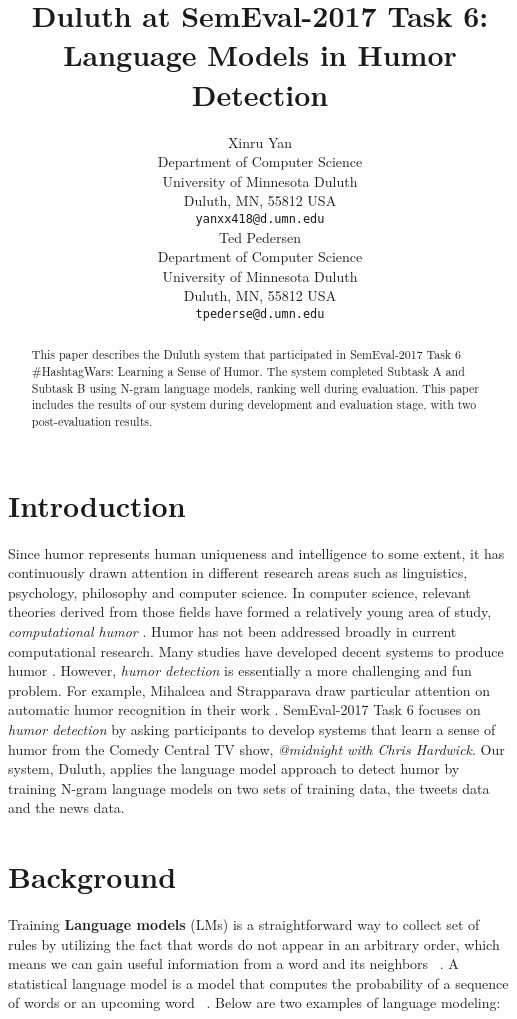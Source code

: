 \documentclass[11pt,a4paper]{article}
\title{Duluth at SemEval-2017 Task 6:  Language Models in Humor Detection}
\author{Xinru Yan \\
  Department of Computer Science \\ University of Minnesota Duluth \\ Duluth, MN, 55812 USA \\
  {\tt yanxx418@d.umn.edu} \\\And
  Ted Pedersen \\
  Department of Computer Science \\ University of Minnesota Duluth \\ Duluth, MN, 55812 USA \\
  {\tt tpederse@d.umn.edu} \\}
\date{}
\begin{document}
\maketitle
\begin{abstract}
  This paper describes the Duluth system that participated in SemEval-2017 Task 6 \#HashtagWars: Learning a Sense of Humor. The system completed Subtask A and Subtask B using N-gram language models, ranking well during evaluation. This paper includes the results of our system during development and evaluation stage, with two post-evaluation results. 
\end{abstract}

\section{Introduction}
Since humor represents human uniqueness and intelligence to some extent, it has continuously drawn attention in different research areas such as linguistics, psychology, philosophy and computer science. In computer science, relevant theories derived from those fields have formed a relatively young area of study, \textit{computational humor} \cite{Recognizing:Humor:On:Twitter}. Humor has not been addressed broadly in current computational research. Many studies have developed decent systems to produce humor \cite{ozbal2012computational}. However, \textit{humor detection} is essentially a more challenging and fun problem. For example, Mihalcea and Strapparava draw particular attention on automatic humor recognition in their work \cite{Learning:To:Laugh}. SemEval-2017 Task 6 focuses on \textit{humor detection} by asking participants to develop systems that learn a sense of humor from the Comedy Central TV show, \textit{@midnight with Chris Hardwick}. Our system, Duluth, applies the language model approach to detect humor by training N-gram language models on two sets of training data, the tweets data and the news data.


\section{Background}
Training \textbf{Language models} (LMs) is a straightforward way to collect set of rules by utilizing the fact that words do not appear in an arbitrary order, which means we can gain useful information from a word and its neighbors ~\cite{JM}. A statistical language model is a model that computes the probability of a sequence of words or an upcoming word ~\cite{JM}. Below are two examples of language modeling:
\end{document}
